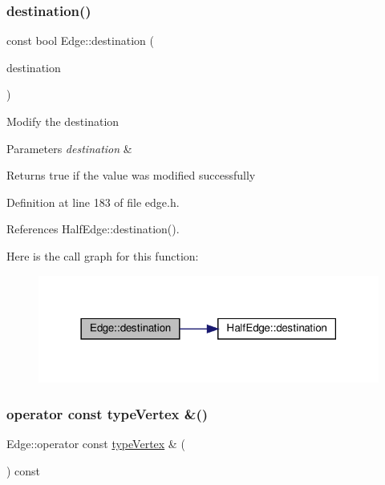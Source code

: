 \subsubsection{\texorpdfstring{destination()}{destination()}\hspace{0.1cm}{\footnotesize\ttfamily [2/2]}}
{\footnotesize\ttfamily const bool Edge\+::destination (\begin{DoxyParamCaption}\item[{const \hyperlink{edge_8h_a5fbd20c46956d479cb10afc9855223f6}{type\+Vertex} \&}]{destination }\end{DoxyParamCaption})\hspace{0.3cm}{\ttfamily [inline]}}

Modify the destination 
\begin{DoxyParams}{Parameters}
{\em destination} & \\
\hline
\end{DoxyParams}
\begin{DoxyReturn}{Returns}
true if the value was modified successfully 
\end{DoxyReturn}


Definition at line 183 of file edge.\+h.



References Half\+Edge\+::destination().

Here is the call graph for this function\+:
\nopagebreak
\begin{figure}[H]
\begin{center}
\leavevmode
\includegraphics[width=318pt]{classEdge_a98a9a06f7ed7da370d809fdb1b4c55ce_cgraph}
\end{center}
\end{figure}
\mbox{\label{classEdge_ac7e484c142c7453bed01a18b03053998}} 
\subsubsection{\texorpdfstring{operator const type\+Vertex \&()}{operator const typeVertex \&()}}
{\footnotesize\ttfamily Edge\+::operator const \hyperlink{edge_8h_a5fbd20c46956d479cb10afc9855223f6}{type\+Vertex} \& (\begin{DoxyParamCaption}{ }\end{DoxyParamCaption}) const\hspace{0.3cm}{\ttfamily [inline]}}

